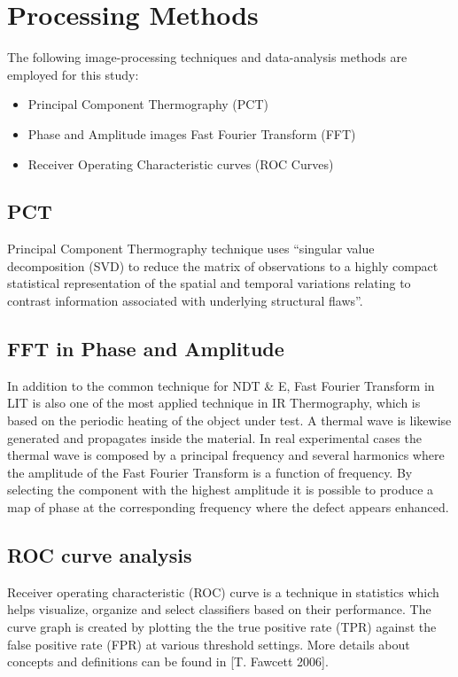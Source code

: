\documentclass[]{spie}  %
\begin{document}



\section{Processing Methods} %
\label{sec:processing_methods}
The following image-processing techniques and data-analysis methods are employed for this study:
\begin{itemize}
   \item Principal Component Thermography (PCT)
   \item Phase and Amplitude images Fast Fourier Transform (FFT)
   \item Receiver Operating Characteristic curves (ROC Curves)
\end{itemize}

\subsection{PCT}
Principal Component Thermography technique\cite{Rajic2002} uses “singular value decomposition (SVD) to reduce the matrix of observations to a highly compact statistical representation of the spatial and temporal variations relating to contrast information associated with underlying structural flaws”.

\subsection{FFT in Phase and Amplitude}
In addition to the common technique for NDT \& E, Fast Fourier Transform in LIT\cite{wu1998lock} is also one of the most applied technique in IR Thermography, which is based on the periodic heating of the object under test. A thermal wave is likewise generated and propagates inside the material. In real experimental cases the thermal wave is composed by a principal frequency and several harmonics where the amplitude of the Fast Fourier Transform is a function of frequency. By selecting the component with the highest amplitude it is possible to produce a map of phase at the corresponding frequency where the defect appears enhanced.


\subsection{ROC curve analysis} %
\label{sub:roc_curve_analysis}
Receiver operating characteristic (ROC) curve is a technique in statistics which helps visualize, organize and select classifiers based on their performance. The curve graph is created by plotting the the true positive rate (TPR) against the false positive rate (FPR) at various threshold settings. More details about concepts and definitions can be found in [T. Fawcett 2006]\cite{Fawcett2006}.
\end{document}
